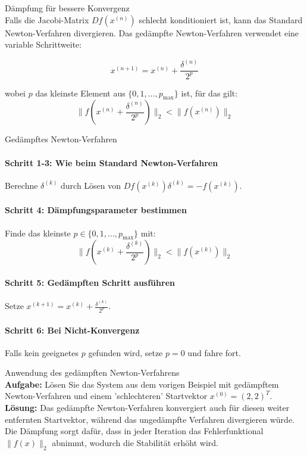 \begin{concept}{Dämpfung für bessere Konvergenz}\\
Falls die Jacobi-Matrix $Df(x^{(n)})$ schlecht konditioniert ist, kann das Standard Newton-Verfahren divergieren. Das gedämpfte Newton-Verfahren verwendet eine variable Schrittweite:

$$x^{(n+1)} = x^{(n)} + \frac{\delta^{(n)}}{2^p}$$

wobei $p$ das kleinste Element aus $\{0, 1, ..., p_{\max}\}$ ist, für das gilt:
$$\|f(x^{(n)} + \frac{\delta^{(n)}}{2^p})\|_2 < \|f(x^{(n)})\|_2$$
\end{concept}

\begin{KR}{Gedämpftes Newton-Verfahren}
\paragraph{Schritt 1-3: Wie beim Standard Newton-Verfahren}
Berechne $\delta^{(k)}$ durch Lösen von $Df(x^{(k)}) \delta^{(k)} = -f(x^{(k)})$.

\paragraph{Schritt 4: Dämpfungsparameter bestimmen}
Finde das kleinste $p \in \{0, 1, ..., p_{\max}\}$ mit:
$$\|f(x^{(k)} + \frac{\delta^{(k)}}{2^p})\|_2 < \|f(x^{(k)})\|_2$$

\paragraph{Schritt 5: Gedämpften Schritt ausführen}
Setze $x^{(k+1)} = x^{(k)} + \frac{\delta^{(k)}}{2^p}$.

\paragraph{Schritt 6: Bei Nicht-Konvergenz}
Falls kein geeignetes $p$ gefunden wird, setze $p = 0$ und fahre fort.
\end{KR}

\begin{example2}{Anwendung des gedämpften Newton-Verfahrens}\\
\textbf{Aufgabe:} Lösen Sie das System aus dem vorigen Beispiel mit gedämpftem Newton-Verfahren und einem 'schlechteren' Startvektor $x^{(0)} = (2, 2)^T$.
\vspace{1mm}\\
\textbf{Lösung:}
Das gedämpfte Newton-Verfahren konvergiert auch für diesen weiter entfernten Startvektor, während das ungedämpfte Verfahren divergieren würde. Die Dämpfung sorgt dafür, dass in jeder Iteration das Fehlerfunktional $\|f(x)\|_2$ abnimmt, wodurch die Stabilität erhöht wird.
\end{example2}

